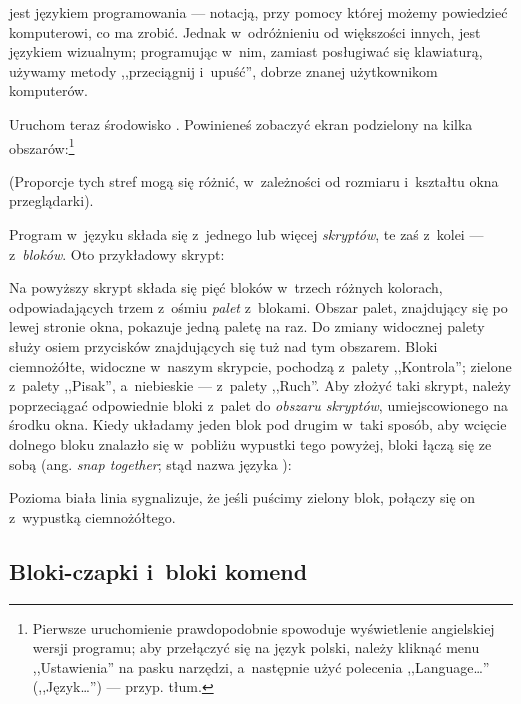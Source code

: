 \documentclass{report}
\begin{document}
\Snap{} jest językiem programowania --- notacją, przy pomocy której możemy powiedzieć komputerowi, co ma zrobić. Jednak w~odróżnieniu od większości innych, \Snap{} jest językiem wizualnym; programując w~nim, zamiast posługiwać się klawiaturą, używamy metody ,,przeciągnij i~upuść'', dobrze znanej użytkownikom komputerów.

Uruchom teraz środowisko \Snap{}. Powinieneś zobaczyć ekran podzielony na kilka obszarów:\footnote{\onehalfspacing Pierwsze uruchomienie  prawdopodobnie spowoduje wyświetlenie angielskiej wersji programu; aby przełączyć się na język polski, należy kliknąć menu ,,Ustawienia''  na pasku narzędzi, a~następnie użyć polecenia ,,Language\ldots'' (,,Język\ldots'') --- przyp. tłum.}

\begin{center}
\def\svgwidth{\textwidth}

\end{center}

(Proporcje tych stref mogą się różnić, w~zależności od rozmiaru i~kształtu okna przeglądarki).

Program w~języku \Snap{} składa się z~jednego lub więcej \emph{skryptów}, te zaś z~kolei --- z~\emph{bloków}. Oto przykładowy skrypt:

\label{fig:typowy-skrypt}

Na powyższy skrypt składa się pięć bloków w~trzech różnych kolorach, odpowiadających trzem z~ośmiu \emph{palet} z~blokami. Obszar palet, znajdujący się po lewej stronie okna, pokazuje jedną paletę na raz. Do zmiany widocznej palety służy osiem przycisków znajdujących się tuż nad tym obszarem. Bloki ciemnożółte, widoczne w~naszym skrypcie, pochodzą z~palety ,,Kontrola''; zielone z~palety ,,Pisak'', a~niebieskie --- z~palety ,,Ruch''. Aby złożyć taki skrypt, należy poprzeciągać odpowiednie bloki z~palet do \emph{obszaru skryptów}, umiejscowionego na środku okna. Kiedy układamy jeden blok pod drugim w~taki sposób, aby wcięcie dolnego bloku znalazło się w~pobliżu wypustki tego powyżej, bloki łączą się ze sobą (ang. \textit{snap together}; stąd nazwa języka \Snap{}):


Pozioma biała linia sygnalizuje, że jeśli puścimy zielony blok, połączy się on z~wypustką ciemnożółtego.

\subsection{Bloki-czapki i~bloki komend}
\end{document}
